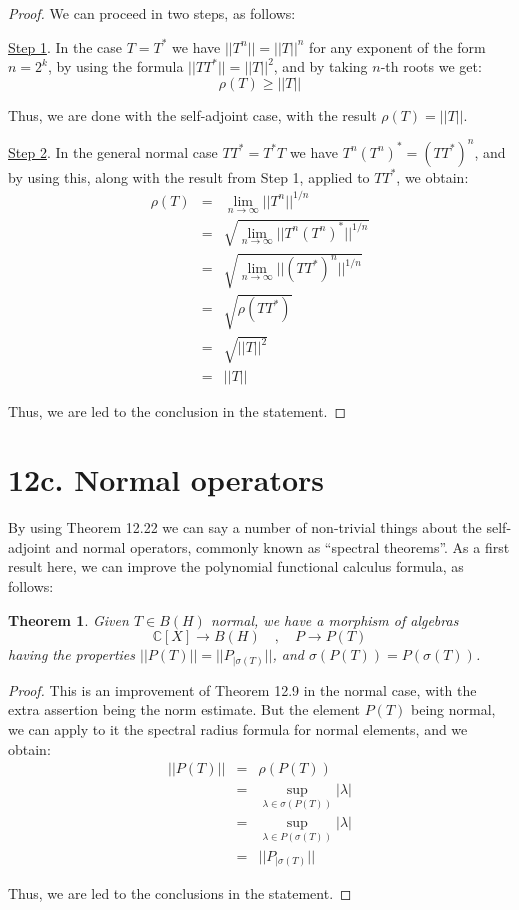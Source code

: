 \documentclass[12pt]{amsbook}
\newtheorem{theorem}{Theorem}[chapter]
\begin{document}
\begin{proof}
We can proceed in two steps, as follows:

\medskip

\underline{Step 1}. In the case $T=T^*$ we have $||T^n||=||T||^n$ for any exponent of the form $n=2^k$, by using the formula $||TT^*||=||T||^2$, and by taking $n$-th roots we get:
$$\rho(T)\geq||T||$$

Thus, we are done with the self-adjoint case, with the result $\rho(T)=||T||$.

\medskip

\underline{Step 2}. In the general normal case $TT^*=T^*T$ we have $T^n(T^n)^*=(TT^*)^n$, and by using this, along with the result from Step 1, applied to $TT^*$, we obtain:
\begin{eqnarray*}
\rho(T)
&=&\lim_{n\to\infty}||T^n||^{1/n}\\
&=&\sqrt{\lim_{n\to\infty}||T^n(T^n)^*||^{1/n}}\\
&=&\sqrt{\lim_{n\to\infty}||(TT^*)^n||^{1/n}}\\
&=&\sqrt{\rho(TT^*)}\\
&=&\sqrt{||T||^2}\\
&=&||T||
\end{eqnarray*}

Thus, we are led to the conclusion in the statement.
\end{proof}

\section*{12c. Normal operators} 

By using Theorem 12.22 we can say a number of non-trivial things about the self-adjoint and normal operators, commonly known as ``spectral theorems''. As a first result here, we can improve the polynomial functional calculus formula, as follows:


\begin{theorem}
Given $T\in B(H)$ normal, we have a morphism of algebras
$$\mathbb C[X]\to B(H)\quad,\quad 
P\to P(T)$$
having the properties $||P(T)||=||P_{|\sigma(T)}||$, and $\sigma(P(T))=P(\sigma(T))$.
\end{theorem}

\begin{proof}
This is an improvement of Theorem 12.9 in the normal case, with the extra assertion being the norm estimate. But the element $P(T)$ being normal, we can apply to it the spectral radius formula for normal elements, and we obtain:
\begin{eqnarray*}
||P(T)||
&=&\rho(P(T))\\
&=&\sup_{\lambda\in\sigma(P(T))}|\lambda|\\
&=&\sup_{\lambda\in P(\sigma(T))}|\lambda|\\
&=&||P_{|\sigma(T)}||
\end{eqnarray*}

Thus, we are led to the conclusions in the statement.
\end{proof}
\end{document}
